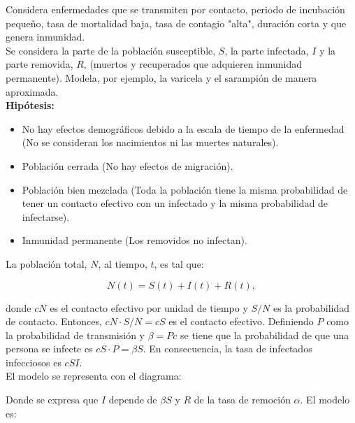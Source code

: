 \documentclass[10pt,oneside]{article}
\theoremstyle{definition}
\begin{document}
\begin{multicols}{2}
    Considera enfermedades que se transmiten por contacto, periodo de incubación pequeño, tasa de mortalidad baja, tasa de contagio "alta", duración corta y que genera inmunidad.\\ \newline Se considera la parte de la población susceptible, $S$, la parte infectada, $I$ y la parte removida, $R$, (muertos y recuperados que adquieren inmunidad permanente). Modela, por ejemplo, la varicela y el sarampión de manera aproximada.\\ \newline \textbf{Hipótesis:}

    \begin{itemize}
        \item No hay efectos demográficos debido a la escala de tiempo de la enfermedad (No se consideran los nacimientos ni las muertes naturales).
        \item Población cerrada (No hay efectos de migración).
        \item Población bien mezclada (Toda la población tiene la misma probabilidad de tener un contacto efectivo con un infectado y la misma probabilidad de infectarse).
        \item Inmunidad permanente (Los removidos no infectan).
    \end{itemize}

    La población total, $N$, al tiempo, $t$, es tal que:
    
    \begin{equation}\label{eq:1}
        N(t)=S(t)+I(t)+R(t),
    \end{equation}
    
    donde $cN$ es el contacto efectivo por unidad de tiempo y $S/N$ es la probabilidad de contacto. Entonces, $cN\cdot S/N=cS$ es el contacto efectivo. Definiendo $P$ como la probabilidad de transmisión y $\beta=Pc$ se tiene que la probabilidad de que una persona se infecte es $cS\cdot P=\beta S$. En consecuencia, la tasa de infectados infecciosos es $cSI$. \\ \newline El modelo se representa con el diagrama:
    \begin{center}\vspace{0.3cm}
       \hspace{0.6cm} 
       \vspace{0.3cm}
    \end{center} Donde se expresa que $I$ depende de $\beta S$ y $R$ de la tasa de remoción $\alpha$. El modelo es:


\end{multicols}
\end{document}
